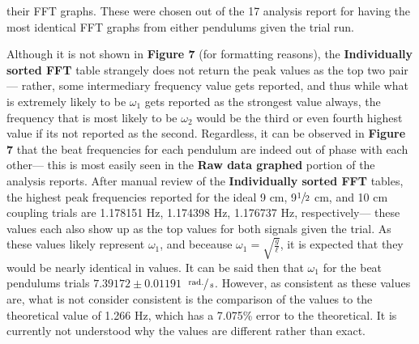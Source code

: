\documentclass[12pt]{article}
\newcommand{\s}{\;\mathrm{s}}
\newcommand{\radian}{\;\mathrm{rad.}}
\begin{document}
\begin{multicols}{2}
\noindent
their FFT graphs.
These were chosen out of the 17 analysis report for having the most identical FFT graphs from either pendulums given the trial run.

Although it is not shown in \textbf{Figure 7} (for formatting reasons),
the \textbf{Individually sorted FFT} table strangely does not return the peak values as the top two pair---
rather, some intermediary frequency value gets reported,
and thus while what is extremely likely to be $\omega_1$ gets reported as the strongest value always,
the frequency that is most likely to be $\omega_2$ would be the third or even fourth highest value if its not reported as the second.
Regardless, it can be observed in \textbf{Figure 7} that the beat frequencies for each pendulum are indeed out of phase with each other---
this is most easily seen in the \textbf{Raw data graphed} portion of the analysis reports.
After manual review of the \textbf{Individually sorted FFT} tables,
the highest peak frequencies reported for the ideal 9 cm, 9$\sfrac{1}{2}$ cm, and 10 cm coupling trials are 1.178151 Hz, 1.174398 Hz, 1.176737 Hz, respectively---
these values each also show up as the top values for both signals given the trial.
As these values likely represent $\omega_1$, and beceause $\displaystyle{\omega_1=\sqrt{\frac{g}{\ell}}}$, it is expected that they would be nearly identical in values.
It can be said then that $\omega_1$ for the beat pendulums trials $7.39172\pm0.01191$ $\sfrac{\radian}{\s}$.
However, as consistent as these values are, what is not consider consistent is the comparison of the values to the theoretical value of 1.266 Hz,
which has a 7.075\% error to the theoretical.
It is currently not understood why the values are different rather than exact.


\end{multicols}
\end{document}
